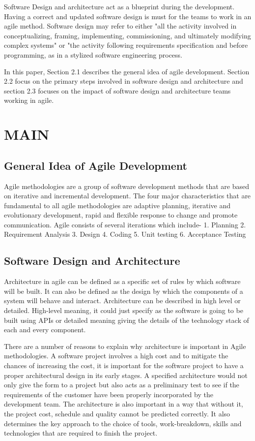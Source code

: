 \documentclass[sigplan,screen]{acmart}
\begin{document}
Software Design and architecture act as a blueprint during the development. Having a correct and updated software design is must for the teams to work in an agile method. Software design may refer to either "all the activity involved in conceptualizing, framing, implementing, commissioning, and ultimately modifying complex systems" or "the activity following requirements specification and before programming, as in a stylized software engineering process.\cite{freeman01}


In this paper, Section 2.1 describes the general idea of agile development. Section 2.2 focus on the primary steps involved in software design and architecture and section 2.3 focuses on the impact of software design and architecture teams working in agile.


\section{MAIN}
\subsection{General Idea of Agile Development}
Agile methodologies are a group of software development methods that are based on iterative and incremental development. The four major characteristics that are fundamental to all agile methodologies are adaptive planning, iterative and evolutionary development, rapid and flexible response to change and promote communication. Agile consists of several iterations which include- 1. Planning 2. Requirement Analysis 3. Design 4. Coding 5. Unit testing 6. Acceptance Testing\cite{Architecture05}


\subsection{Software Design and Architecture}
Architecture in agile can be defined as a specific set of rules by which software will be built. It can also be defined as the design by which the components of a system will behave and interact. Architecture can be described in high level or detailed. High-level meaning, it could just specify as the software is going to be built using APIs or detailed meaning giving the details of the technology stack of each and every component.

There are a number of reasons to explain why architecture is important in Agile methodologies. A software project involves a high cost and to mitigate the chances of increasing the cost, it is important for the software project to have a proper architectural design in its early stages. A specified architecture would not only give the form to a project but also acts as a preliminary test to see if the requirements of the customer have been properly incorporated by the development team. The architecture is also important in a way that without it, the project cost, schedule and quality cannot be predicted correctly. It also determines the key approach to the choice of tools, work-breakdown, skills and technologies that are required to finish the project.
\end{document}
